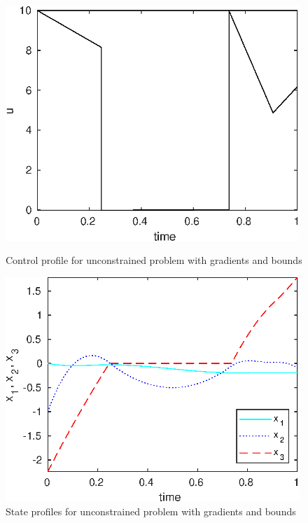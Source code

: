 \begin{figure}[htb]
\begin{minipage}[t]{0.5\linewidth}
\centering
\includegraphics[width=0.99\textwidth]{examples/problem2/graphs/u_624a.eps}
\caption[Tutorial example 3: control profile]{Control profile for
  unconstrained problem with gradients and bounds} \label{fig:prob2_u} 
\end{minipage}
\begin{minipage}[t]{0.5\linewidth}
\centering
\includegraphics[width=0.99\textwidth]{examples/problem2/graphs/x13_624a.eps}
\caption[Tutorial example 3: state profiles]{State profiles for
  unconstrained problem with gradients and bounds} \label{fig:prob2_x}
\end{minipage}
\end{figure}

